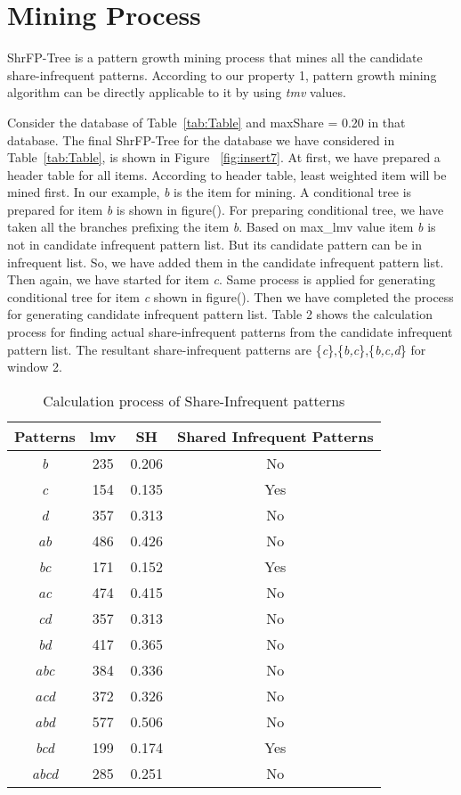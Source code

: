 \section{Mining Process}
ShrFP-Tree is a pattern growth mining process that mines all the candidate share-infrequent patterns. According to our property 1, pattern growth mining algorithm can be directly applicable to it by using {\it tmv} values.
\par Consider the database of Table~\ref{tab:Table} and maxShare = 0.20 in that database. The final ShrFP-Tree for the database we have considered in Table~\ref{tab:Table}, is shown in Figure ~\ref{fig:insert7}. At first, we have prepared a header table for all items. According to header table, least weighted item will be mined first. In our example, {\it b} is the item for mining. A conditional tree is prepared for item {\it b} is shown in figure(). For preparing conditional tree, we have taken all the branches prefixing the item {\it b}. Based on max{\_}lmv value item {\it b} is not in candidate infrequent pattern list. But its candidate pattern can be in infrequent list. So, we have added them in the candidate infrequent pattern list. Then again, we have started for item {\it c}. Same process is applied for generating conditional tree for item {\it c} shown in figure(). Then we have completed the process for generating candidate infrequent pattern list. Table 2 shows the calculation process for finding actual share-infrequent patterns from the candidate infrequent pattern list. The resultant share-infrequent patterns are \{{\it c}\},\{{\it b,c}\},\{{\it b,c,d}\} for window 2.
\begin{table}
\begin{center}
\begin{tabular}{ |c|c|c|c| } 
\hline
Patterns & lmv & SH & Shared Infrequent Patterns \\
\hline
{\it b} & 235 & 0.206 & No\\
{\it c} & 154 & 0.135 & Yes\\
{\it d} & 357 & 0.313 & No\\
{\it ab} & 486 & 0.426 & No\\
{\it bc} & 171 & 0.152 & Yes\\
{\it ac} & 474 & 0.415 & No\\
{\it cd} & 357 & 0.313 & No\\
{\it bd} & 417 & 0.365 & No\\
{\it abc} & 384 & 0.336 & No\\
{\it acd} & 372 & 0.326 & No\\
{\it abd} & 577 & 0.506 & No\\
{\it bcd} & 199 & 0.174 & Yes\\
{\it abcd} & 285 & 0.251 & No\\


\hline
\end{tabular}
\caption{Calculation process of Share-Infrequent patterns}
\label{tab:Table2}
\end{center}
\end{table}

